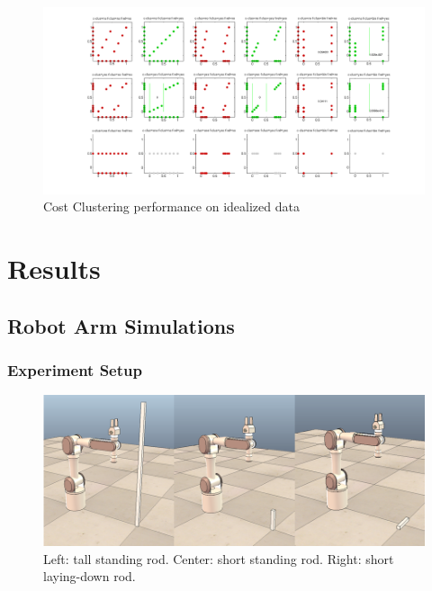 \documentclass[12pt]{article}
\begin{document}
\begin{figure}[ht]
  \centerline{
  \includegraphics[width=1.5\columnwidth]{cluster_costs.png}}
  \caption{\label{fig_label} Cost Clustering performance on idealized data}
  \label{fig:clustercosts}
\end{figure}

\section{Results}
\subsection{Robot Arm Simulations}
\subsubsection{Experiment Setup}

\begin{figure}[ht]
  \centering
  \includegraphics[width=0.9\columnwidth]{robots.png}
  \caption{\label{fig_label} Left: tall standing rod. Center: short standing rod. Right: short laying-down rod.
  \label{fig:robots}
  }
\end{figure}
\end{document}
